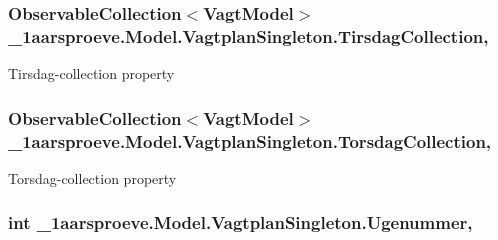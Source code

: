 \subsubsection[{Tirsdag\+Collection}]{\setlength{\rightskip}{0pt plus 5cm}Observable\+Collection$<${\bf Vagt\+Model}$>$ \+\_\+1aarsproeve.\+Model.\+Vagtplan\+Singleton.\+Tirsdag\+Collection\hspace{0.3cm}{\ttfamily [get]}, {\ttfamily [set]}}\label{class__1aarsproeve_1_1_model_1_1_vagtplan_singleton_acc54a5368a75c1dc19f867f120f2dd62}


Tirsdag-\/collection property 

\hypertarget{class__1aarsproeve_1_1_model_1_1_vagtplan_singleton_a13ff802bb261b6972c3bddd4b5420125}{}
\subsubsection[{Torsdag\+Collection}]{\setlength{\rightskip}{0pt plus 5cm}Observable\+Collection$<${\bf Vagt\+Model}$>$ \+\_\+1aarsproeve.\+Model.\+Vagtplan\+Singleton.\+Torsdag\+Collection\hspace{0.3cm}{\ttfamily [get]}, {\ttfamily [set]}}\label{class__1aarsproeve_1_1_model_1_1_vagtplan_singleton_a13ff802bb261b6972c3bddd4b5420125}


Torsdag-\/collection property 

\hypertarget{class__1aarsproeve_1_1_model_1_1_vagtplan_singleton_a15018dbaee9711170c17635c6665480d}{}
\subsubsection[{Ugenummer}]{\setlength{\rightskip}{0pt plus 5cm}int \+\_\+1aarsproeve.\+Model.\+Vagtplan\+Singleton.\+Ugenummer\hspace{0.3cm}{\ttfamily [get]}, {\ttfamily [set]}}\label{class__1aarsproeve_1_1_model_1_1_vagtplan_singleton_a15018dbaee9711170c17635c6665480d}


